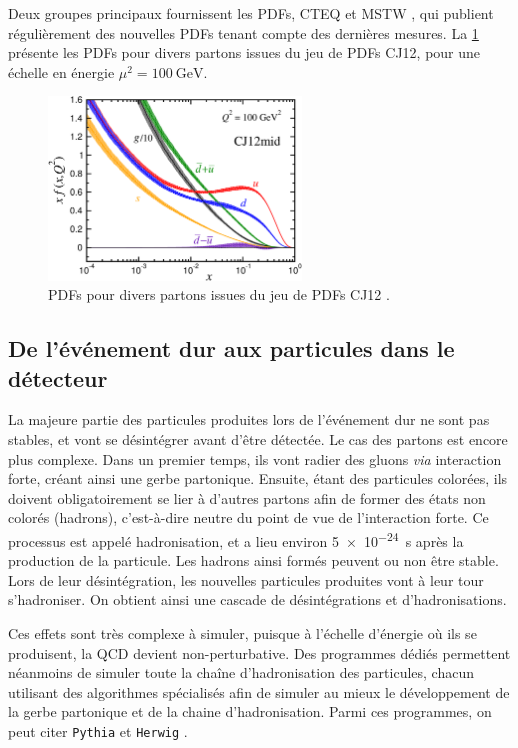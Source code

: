 \smallskip

Deux groupes principaux fournissent les PDFs, CTEQ \citep{Owens:2012bv} et MSTW \citep{Martin:2009iq}, qui publient régulièrement des nouvelles PDFs tenant compte des dernières mesures. La \cref{fig:cj12} présente les PDFs pour divers partons issues du jeu de PDFs CJ12, pour une échelle en énergie $\mu^2 = \SI{100}{\GeV}$.

\begin{figure}[tbp]
  \centering
  \includegraphics[width=0.6\textwidth]{chapitre3/figs/Fx_errl.pdf}
  \caption{PDFs pour divers partons issues du jeu de PDFs CJ12 \citep{Owens:2012bv}.}
  \label{fig:cj12}
\end{figure}


\subsection{De l'événement dur aux particules dans le détecteur}

La majeure partie des particules produites lors de l'événement dur ne sont pas stables, et vont se désintégrer avant d'être détectée. Le cas des partons est encore plus complexe. Dans un premier temps, ils vont radier des gluons \emph{via} interaction forte, créant ainsi une gerbe partonique. Ensuite, étant des particules colorées, ils doivent obligatoirement se lier à d'autres partons afin de former des états non colorés (hadrons), c'est-à-dire neutre du point de vue de l'interaction forte. Ce processus est appelé hadronisation, et a lieu environ \SI{5e-24}{\s} après la production de la particule. Les hadrons ainsi formés peuvent ou non être stable. Lors de leur désintégration, les nouvelles particules produites vont à leur tour s'hadroniser. On obtient ainsi une cascade de désintégrations et d'hadronisations.

Ces effets sont très complexe à simuler, puisque à l'échelle d'énergie où ils se produisent, la QCD devient non-perturbative. Des programmes dédiés permettent néanmoins de simuler toute la chaîne d'hadronisation des particules, chacun utilisant des algorithmes spécialisés afin de simuler au mieux le développement de la gerbe partonique et de la chaine d'hadronisation. Parmi ces programmes, on peut citer \texttt{Pythia} \citep{pythia} et \texttt{Herwig} \citep{Corcella:2000bw}.

